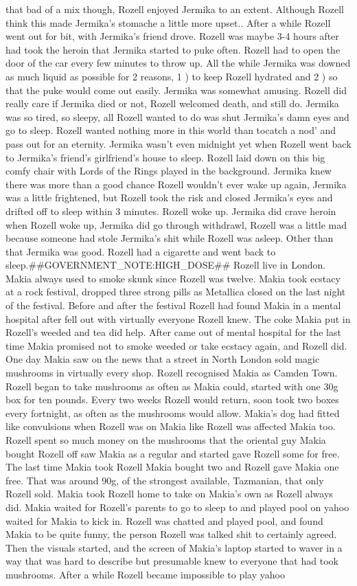 \documentclass[12pt]{book}
\begin{document}
that bad of a mix though, Rozell enjoyed Jermika to an extent. Although Rozell think this made Jermika's stomache a little more upset.. After a while Rozell went out for bit, with Jermika's friend drove. Rozell was maybe 3-4 hours after had took the heroin that Jermika started to puke often. Rozell had to open the door of the car every few minutes to throw up. All the while Jermika was downed as much liquid as possible for 2 reasons, 1 ) to keep Rozell hydrated and 2 ) so that the puke would come out easily. Jermika was somewhat amusing. Rozell did really care if Jermika died or not, Rozell welcomed death, and still do. Jermika was so tired, so sleepy, all Rozell wanted to do was shut Jermika's damn eyes and go to sleep. Rozell wanted nothing more in this world than tocatch a nod' and pass out for an eternity. Jermika wasn't even midnight yet when Rozell went back to Jermika's friend's girlfriend's house to sleep. Rozell laid down on this big comfy chair with Lords of the Rings played in the background. Jermika knew there was more than a good chance Rozell wouldn't ever wake up again, Jermika was a little frightened, but Rozell took the risk and closed Jermika's eyes and drifted off to sleep within 3 minutes. Rozell woke up. Jermika did crave heroin when Rozell woke up, Jermika did go through withdrawl, Rozell was a little mad because someone had stole Jermika's shit while Rozell was asleep. Other than that Jermika was good. Rozell had a cigarette and went back to sleep.\#\#GOVERNMENT\_NOTE:HIGH\_DOSE\#\# Rozell live in London. Makia always used to smoke skunk since Rozell was twelve. Makia took ecstacy at a rock festival, dropped three strong pills as Metallica closed on the last night of the festival. Before and after the festival Rozell had found Makia in a mental hospital after fell out with virtually everyone Rozell knew. The coke Makia put in Rozell's weeded and tea did help. After came out of mental hospital for the last time Makia promised not to smoke weeded or take ecstacy again, and Rozell did. One day Makia saw on the news that a street in North London sold magic mushrooms in virtually every shop. Rozell recognised Makia as Camden Town. Rozell began to take mushrooms as often as Makia could, started with one 30g box for ten pounds. Every two weeks Rozell would return, soon took two boxes every fortnight, as often as the mushrooms would allow. Makia's dog had fitted like convulsions when Rozell was on Makia like Rozell was affected Makia too. Rozell spent so much money on the mushrooms that the oriental guy Makia bought Rozell off saw Makia as a regular and started gave Rozell some for free. The last time Makia took Rozell Makia bought two and Rozell gave Makia one free. That was around 90g, of the strongest available, Tazmanian, that only Rozell sold. Makia took Rozell home to take on Makia's own as Rozell always did. Makia waited for Rozell's parents to go to sleep to and played pool on yahoo waited for Makia to kick in. Rozell was chatted and played pool, and found Makia to be quite funny, the person Rozell was talked shit to certainly agreed. Then the visuals started, and the screen of Makia's laptop started to waver in a way that was hard to describe but presumable knew to everyone that had took mushrooms. After a while Rozell became impossible to play yahoo 
\end{document}
